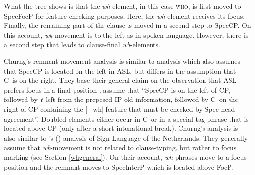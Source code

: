 What the tree shows is that the \textit{wh}-element, in this case \textsc{who}, is first moved to SpecFocP for feature checking purposes. Here, the \textit{wh}-element receives its focus. Finally, the remaining part of the clause is moved in a second step to SpecCP. On this account, \textit{wh}-movement is to the left as in spoken language. However, there is a second step that leads to clause-final \textit{wh}-elements.



Churng's remnant-movement analysis is similar to \citet{sarac2007cross} analysis which also assumes that SpecCP is located on the left in ASL, but differs in the assumption that C\textdegree\ is on the right. They base their general claim on the observation that ASL prefers focus in a final position \citep{wilbur1996evidence, wilbur1997prosodic, wilbur1998body}. \citet[212]{sarac2007cross} assume that ``SpecCP is on the left of CP, followed by $\textrm{\textit{t}}$ left from the preposed IP old information, followed by C\textdegree\ on the right of CP containing the $[+$wh$]$ feature that must be checked by Spec-head agreement''. Doubled elements either occur in C\textdegree\ or in a special tag phrase that is located above CP (only after a short intonational break). Churng's analysis is also similar to \citeauthor{aboh2010sa}'s (\citeyear{aboh2010sa}) analysis of Sign Language of the Netherlands. They generally assume that \textit{wh}-movement is not related to clause-typing, but rather to focus marking (see Section \ref{whgeneral}). On their account, \textit{wh}-phrases move to a focus position and the remnant moves to SpecInterP which is located above FocP.




\begin{exe}
\ex\label{ex:churngremnantmovement}
\resizebox{.9\textwidth}{!}{
\begin{forest}
for tree={s sep=25mm, inner sep=0, l=12mm} %
[CP [IP [{\textsc{hate john}},roof,name=hj]] [{$\overline{\textrm{C}}$} [{C\textdegree } ] [FocP [{\textsc{who}\textsubscript{$+$foc}}, name=who ] [{$\overline{\textrm{Foc}}$} [{Foc\textdegree \\ $[+$foc$]$ } ] [{\textit{t}\textsubscript{IP}} [{\textit{t}\textsubscript{\textsc{who}} \textsc{hate john}}, roof, name=unten]] ] ]]]
\draw[semithick, ->] (unten.west) to [bend right=-45] node [midway,fill=white]
{\textsc{1}} (who.south);
\draw[semithick, ->] (unten.south) to [bend right=-45] node [midway,fill=white]
{\textsc{2}} (hj.south);
\end{forest}
}
\end{exe}

